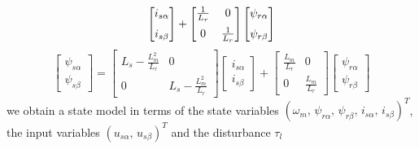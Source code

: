 \documentclass[12pt,a4paper,oneside]{book}
\begin{document}
\begin{onehalfspace}
\begin{equation}
	\left[\begin{matrix}
		i_{s\alpha} \\[6pt]
		i_{s\beta}
	\end{matrix}\right]+
	\left[\begin{matrix}
		\frac{1}{L_r} & 0 \\[6pt]
		0 & \frac{1}{L_r}
	\end{matrix}\right]
	\left[\begin{matrix}
		\psi_{r\alpha} \\[6pt]
		\psi_{r\beta}
	\end{matrix}\right]\\[6pt]
\end{equation}
\begin{equation}\label{eq51}
	\left[\begin{matrix}
		\psi_{s\alpha} \\[6pt]
		\psi_{s\beta}
	\end{matrix}\right] = 
	\left[\begin{matrix}
		L_s-\frac{L_m^2}{L_r} & 0 \\[6pt]
		0 & L_s-\frac{L_m^2}{L_r}
	\end{matrix}\right]
	\left[\begin{matrix}
		i_{s\alpha} \\[6pt]
		i_{s\beta}
	\end{matrix}\right]+
	\left[\begin{matrix}
		\frac{L_m}{L_r} & 0 \\[6pt]
		0 & \frac{L_m}{L_r}
	\end{matrix}\right]
	\left[\begin{matrix}
		\psi_{r\alpha} \\[6pt]
		\psi_{r\beta}
	\end{matrix}\right]
\end{equation}
we obtain a state model in terms of the state variables 
$\left(\omega_m,\,\psi_{r\alpha},\, 
\psi_{r\beta},\,i_{s\alpha},\,i_{s\beta}\right)^T$, the input variables 
$\left(u_{s\alpha},\, u_{s\beta}\right)^T$ and the disturbance $\tau_l$


\end{onehalfspace}
\end{document}

